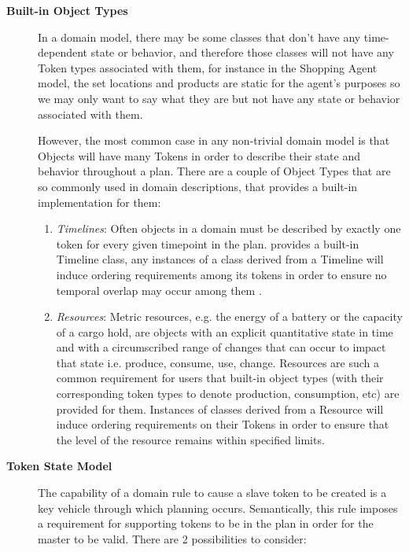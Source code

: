 \begin{description}
\begin{enumerate}
  \end{enumerate}

\item[\textbf{Built-in Object Types}] In a domain model, there may be some classes that don't have any time-dependent state or behavior, and therefore those classes will not have any Token types associated with them, for instance in the Shopping Agent model, the set locations and products are static for the agent's purposes so we may only want to say what they are but not have any state or behavior associated with them.

However, the most common case in any non-trivial domain model is that Objects will have many Tokens  in order to describe their state and behavior throughout a plan. There are a couple of Object Types that are so commonly used in domain descriptions, that \eu provides a built-in implementation for them:

\begin{enumerate}
    \item \textit{Timelines}: Often objects in a domain must be described by exactly one
    token for every given timepoint in the plan. \eu provides a built-in Timeline class, any instances of a class derived from a
    Timeline will induce ordering requirements among its tokens in order
     to ensure no temporal overlap may occur among them  \cite{mus94}. 

    \item \textit{Resources}: Metric resources, e.g. the energy of a battery or the
    capacity of a cargo hold, are objects with an explicit quantitative
    state in time and with a circumscribed range of changes that can occur
     to impact that state i.e. produce, consume, use, change. 
     Resources are such a common requirement for \eu users that built-in object types (with their corresponding token types to denote production, consumption, etc) are provided for them. Instances of classes derived from a Resource will induce
     ordering requirements on their Tokens in order to ensure that the
     level of the resource remains within specified limits.
\end{enumerate}


\item[\textbf{Token State Model}] The capability of a domain rule to cause a slave token to be created
is a key vehicle through which planning occurs. Semantically, this
rule imposes a requirement for supporting tokens to be in the plan in
order for the master to be valid. There are 2 possibilities to
consider:


\end{description}
